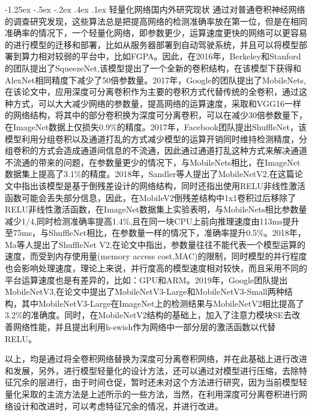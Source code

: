 \documentclass[a4paper, 11pt]{article}
\makeatletter
\newcommand{\xiaosihao}{\fontsize{12pt}{\baselineskip}\selectfont}
\renewcommand\subsection{\@startsection{subsection}{1}{\z@}%
	{-1.25ex \@plus -.5ex \@minus -.2ex}%
	{.4ex \@plus .1ex}%
	{\normalfont\xiaosihao\CJKfamily{hei}}}
\makeatother
\begin{document}
\subsection{轻量化网络国内外研究现状}
通过对普通卷积神经网络的调查研究发现，这些算法总是把提高网络的检测准确率放在第一位，但是在相同准确率的情况下，一个轻量化网络，即参数更少，运算速度更快的网络可以更容易的进行模型的迁移和部署，比如从服务器部署到自动驾驶系统，并且可以将模型部署到算力相对较弱的平台中，比如FGPA。因此，在2016年，Berkeley和Stanford的团队提出了SqueezeNet\cite{SqueezeNet},该模型提出了一个全新的卷积结构，在该模型下获得和AlexNet相同精度下减少了50倍参数量。2017年，Google的团队提出了MobileNets\cite{MobileNets},在该论文中，应用深度可分离卷积作为主要的卷积方式代替传统的全卷积，通过这种方式，可以大大减少网络的参数量，提高网络的运算速度，采取和VGG16\cite{VGGNet}一样的网络结构，将其中的部分卷积换为深度可分离卷积，可以在减少30倍参数量下，在ImageNet数据上仅损失0.9\%的精度。2017年，Facebook团队提出ShuffleNet\cite{ShuffleNet}，该模型利用分组卷积以及通道打乱的方式减少模型的运算开销同时维持检测精度，分组卷积的方式会造成通道间信息的不流通，因此通过通道打乱这种方式来解决通道不流通的带来的问题，在参数量更少的情况下，与MobileNets\cite{MobileNets}相比，在ImageNet数据集上提高了3.1\%的精度。2018年，Sandler等人提出了MobileNetV2\cite{MobileNetV2},在这篇论文中指出该模型是基于倒残差设计的网络结构，同时还指出使用RELU非线性激活函数可能会丢失部分信息，因此，在MobileV2倒残差结构中1x1卷积过后移除了RELU非线性激活函数，在ImageNet数据集上实验表明，与MobileNets\cite{MobileNets}相比参数量减少1/4,同时检测准确率提高1.4\%,且在同一块CPU上前向推理速度由113ms提升至75ms，与ShuffleNet\cite{ShuffleNet}相比，在参数量一样的情况下，准确率提升0.5\%。2018年，Ma\cite{ShuffleNetV2}等人提出了ShuffleNet V2,在论文中指出，参数量往往不能代表一个模型运算的速度，而受到内存使用量(memory access cost,MAC)的限制，同时模型的并行程度也会影响处理速度，理论上来说，并行度高的模型速度相对较快，而且采用不同的平台运算速度也是有差异的，比如：GPU和ARM。2019年，Google团队提出MobileNetV3\cite{MobileNetV3},在论文中提出了MobileNetV3-Large和MobileNetV3-Small两种结构，其中MobileNetV3-Large在ImageNet上的检测结果与MobileNetV2相比提高了3.2\%的准确度。同时，在MobileNetV2结构的基础上，加入了注意力模块SE去改善网络性能，并且提出利用h-swish作为网络中一部分层的激活函数以代替RELU。

以上，均是通过将全卷积网络替换为深度可分离卷积网络，并在此基础上进行改进和发展，另外，进行模型轻量化的设计方法，还可以通过对模型进行压缩，去除特征冗余的层进行，由于时间仓促，暂时还未对这个方法进行研究，因为当前模型轻量化采取的主流方法是上述所示的一些方法，当然，在利用深度可分离卷积进行网络设计和改进时，可以考虑特征冗余的情况，并进行改进。
\end{document}
